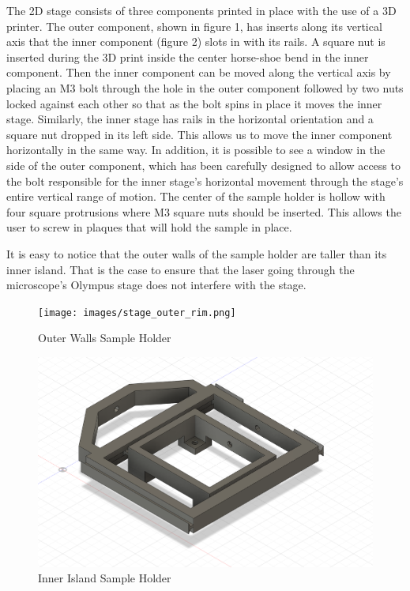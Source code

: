 \documentclass[runningheads]{llncs}
\begin{document}
The 2D stage consists of three components printed in place with the use of a 3D printer. The outer component, shown in figure 1, has inserts along its vertical axis that the inner component (figure 2) slots in with its rails. A square nut is inserted during the 3D print inside the center horse-shoe bend in the inner component. Then the inner component can be moved along the vertical axis by placing an M3 bolt through the hole in the outer component followed by two nuts locked against each other so that as the bolt spins in place it moves the inner stage. Similarly, the inner stage has rails in the horizontal orientation and a square nut dropped in its left side. This allows us to move the inner component horizontally in the same way. In addition, it is possible to see a window in the side of the outer component, which has been carefully designed to allow access to the bolt responsible for the inner stage's horizontal movement through the stage's entire vertical range of motion. The center of the sample holder is hollow with four square protrusions where M3 square nuts should be inserted. This allows the user to screw in plaques that will hold the sample in place.

It is easy to notice that the outer walls of the sample holder are taller than its inner island. That is the case to ensure that the laser going through the microscope's Olympus stage does not interfere with the stage. 

\begin{figure}[h]
    \centering
    \begin{minipage}[b]{0.45\textwidth}
        \centering
        \texttt{[image: images/stage\_outer\_rim.png]} %
        \caption{Outer Walls Sample Holder}
    \end{minipage}
    \hfill
    \begin{minipage}[b]{0.45\textwidth}
        \centering
        \includegraphics[width=\textwidth]{images/inner_stage.png} 
        \caption{Inner Island Sample Holder}
    \end{minipage}
\end{figure}
\end{document}
